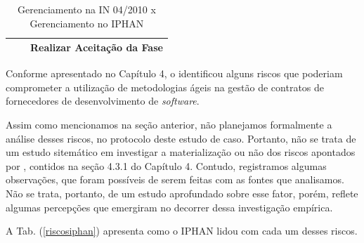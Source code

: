 \begin{table}[H]
\begin{tabular}{|p{3.0cm}|p{4.0cm}|p{3.0cm}|p{4.0cm}|}
\multicolumn{2}{|l|}{}                                                                                                                                                                                                  &                                  & Realizar Aceitação da Fase                                                                                                      \\ \hline
\end{tabular}
\caption{Gerenciamento na IN 04/2010 x Gerenciamento no IPHAN}
\label{gctiiphan}
\end{table}


Conforme apresentado no Capítulo 4, o  identificou alguns riscos que poderiam comprometer a utilização de metodologias ágeis na gestão de contratos de fornecedores de desenvolvimento de \textit{software}. 

Assim como mencionamos na seção anterior, não planejamos formalmente a análise desses riscos, no protocolo deste estudo de caso. Portanto, não se trata de um estudo sitemático em investigar a materialização ou não dos riscos apontados por , contidos na seção 4.3.1 do Capítulo 4. Contudo, registramos algumas observações, que foram possíveis de serem feitas com as fontes que analisamos. Não se trata, portanto, de um estudo aprofundado sobre esse fator, porém, reflete algumas percepções que emergiram no decorrer dessa investigação empírica. 

A Tab. (\ref{riscosiphan}) apresenta como o IPHAN lidou com cada um desses riscos.

